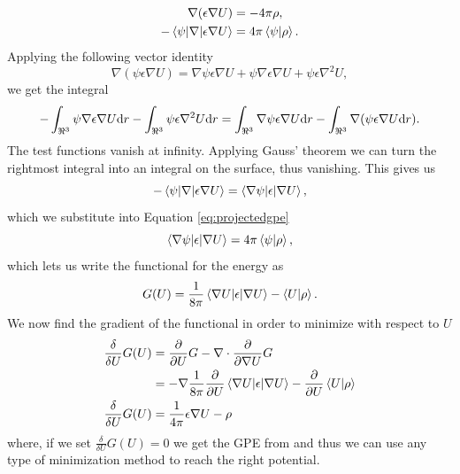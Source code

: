 \documentclass[../master_thesis.tex]{subfiles}
\begin{document}
\begin{align}
  \begin{split}\label{eq:projectedgpe}
    \nabla (\epsilon\nabla U) &= -4\pi\rho,\\
    -\braket{\psi|\nabla |\epsilon\nabla U} &= 4\pi \braket{\psi|\rho}.
  \end{split}
\end{align}
Applying the following vector identity
\begin{equation}
\nabla (\psi \epsilon\nabla U)=\nabla \psi \epsilon \nabla U +  \psi \nabla \epsilon \nabla U +  \psi \epsilon\nabla^{2} U,
\end{equation}
we get the integral
\begin{equation}
  -\int_{\real^3}\psi \nabla \epsilon \nabla U\text{d}r - \int_{\real^3} \psi\epsilon \nabla^{2} U\text{d}r = \int_{\real^3} \nabla \psi \epsilon \nabla U\text{d}r - \int_{\real^3} \nabla (\psi \epsilon\nabla U\text{d}r).
\end{equation}
The test functions vanish at infinity. Applying Gauss' theorem \cite{Lipparini:2013} we can turn the rightmost integral into
an integral on the surface, thus vanishing. This gives us
\begin{equation}
  -\braket{\psi|\nabla|\epsilon\nabla U} = \braket{\nabla \psi |\epsilon | \nabla U},
\end{equation}
which we substitute into Equation \ref{eq:projectedgpe}
\begin{equation}
  \braket{\nabla \psi |\epsilon | \nabla U} =  4\pi \braket{\psi|\rho},
\end{equation}
which lets us write the functional for the energy as \cite{Lipparini:2010bg}
\begin{equation}
  G(U) = \frac{1}{8\pi}  \braket{\nabla U |\epsilon | \nabla U} - \braket{U|\rho}.
\end{equation}
We now find the gradient of the functional in order to minimize with respect to $U$
\begin{align}
  \begin{split}
    \frac{\delta}{\delta U}G(U) &=  \frac{\partial}{\partial U}G - \nabla \cdot \frac{\partial}{\partial \nabla U}G \\
    &= -\nabla \frac{1}{8\pi}\frac{\partial}{\partial U}\braket{\nabla U|\epsilon|\nabla U} - \frac{\partial}{\partial U}\braket{U|\rho} \\
    \frac{\delta}{\delta U}G(U) &= \frac{1}{4\pi}\epsilon\nabla U - \rho
  \end{split}
\end{align}
where, if we set $\frac{\delta}{\delta U}G(U) = 0$ we get the \ac{GPE} from \cite{FossoTande:2013ka}
and thus we can use any type of minimization method to reach the right potential.


\biblio
\end{document}
